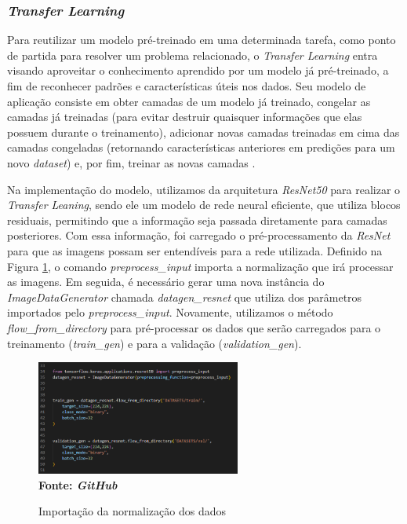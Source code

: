 
\subsubsection{\esp \textit{Transfer Learning}} \label{transfer}
Para reutilizar um modelo pré-treinado em uma determinada tarefa, como ponto de partida para resolver um problema relacionado, o \textit{Transfer Learning} entra visando aproveitar o conhecimento aprendido por um modelo já pré-treinado, a fim de reconhecer padrões e características úteis nos dados. Seu modelo de aplicação consiste em obter camadas de um modelo já treinado, congelar as camadas já treinadas (para evitar destruir quaisquer informações que elas possuem durante o treinamento), adicionar novas camadas treinadas em cima das camadas congeladas (retornando características anteriores em predições para um novo \textit{dataset}) e, por fim, treinar as novas camadas \cite{kerastl}.

Na implementação do modelo, utilizamos da arquitetura \textit{ResNet50} para realizar o \textit{Transfer Leaning}, sendo ele um modelo de rede neural eficiente, que utiliza blocos residuais, permitindo que a informação seja passada diretamente para camadas posteriores. Com essa informação, foi carregado o pré-processamento da \textit{ResNet} para que as imagens possam ser entendíveis para a rede utilizada. Definido na Figura \ref{fig:normaliztion}, o comando \textit{preprocess\_input} importa a normalização que irá processar as imagens. Em seguida, é necessário gerar uma nova instância do \textit{ImageDataGenerator} chamada \textit{datagen\_resnet} que utiliza dos parâmetros importados pelo \textit{preprocess\_input}. Novamente, utilizamos o método \textit{flow\_from\_directory} para pré-processar os dados que serão carregados para o treinamento (\textit{train\_gen}) e para a validação (\textit{validation\_gen}).

 \begin{figure}[ht]
 	\centering	
 	\caption[\hspace{0.1cm}Grade Computacional.]{Importação da normalização dos dados}
 	\vspace{-0.4cm}
 	\includegraphics[width=0.6\textwidth]{figuras/normalization.png}
 	\captionsetup{justification=centering}
	\vspace{-0.2cm}
     \\\textbf{\footnotesize Fonte: \textit{GitHub}}
	\label{fig:normaliztion}
\end{figure}


